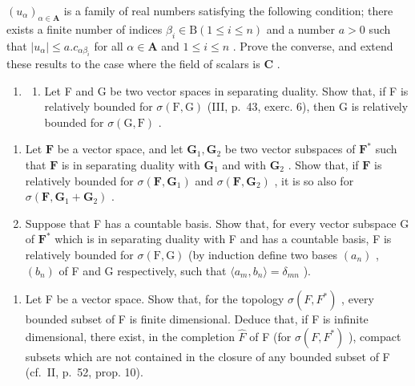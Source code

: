 \((u_{\alpha})_{\alpha \in \mathbf{A}}\) is a family of real numbers satisfying the following condition; there exists a finite number of indices \(\beta_{i}\in \mathrm{B}(1\leqslant i\leqslant n)\) and a number \(a > 0\) such that \(|u_{\alpha}|\leqslant a.c_{\alpha \beta_i}\) for all \(\alpha \in \mathbf{A}\) and \(1\leqslant i\leqslant n\) . Prove the converse, and extend these results to the case where the field of scalars is \(\mathbf{C}\) .

\begin{enumerate}
\def\labelenumi{\arabic{enumi})}
\setcounter{enumi}{1}
\tightlist
\item
  \begin{enumerate}
  \def\labelenumii{\alph{enumii})}
  \tightlist
  \item
    Let F and G be two vector spaces in separating duality. Show that, if F is relatively bounded for \(\sigma(\mathrm{F}, \mathrm{G})\) (III, p.~43, exerc. 6), then G is relatively bounded for \(\sigma(\mathrm{G}, \mathrm{F})\) .
  \end{enumerate}
\end{enumerate}

\begin{enumerate}
\def\labelenumi{\alph{enumi})}
\setcounter{enumi}{1}
\item
  Let \(\mathbf{F}\) be a vector space, and let \(\mathbf{G}_1, \mathbf{G}_2\) be two vector subspaces of \(\mathbf{F}^*\) such that \(\mathbf{F}\) is in separating duality with \(\mathbf{G}_1\) and with \(\mathbf{G}_2\) . Show that, if \(\mathbf{F}\) is relatively bounded for \(\sigma(\mathbf{F}, \mathbf{G}_1)\) and \(\sigma(\mathbf{F}, \mathbf{G}_2)\) , it is so also for \(\sigma(\mathbf{F}, \mathbf{G}_1 + \mathbf{G}_2)\) .
\item
  Suppose that F has a countable basis. Show that, for every vector subspace G of \(\mathbf{F}^*\) which is in separating duality with F and has a countable basis, F is relatively bounded for \(\sigma(\mathrm{F},\mathrm{G})\) (by induction define two bases \((a_n)\) , \((b_n)\) of F and G respectively, such that \(\langle a_m, b_n \rangle = \delta_{mn}\) ).
\end{enumerate}

\begin{enumerate}
\def\labelenumi{\arabic{enumi})}
\setcounter{enumi}{2}
\tightlist
\item
  Let F be a vector space. Show that, for the topology \(\sigma(F, F^{*})\) , every bounded subset of F is finite dimensional. Deduce that, if F is infinite dimensional, there exist, in the completion \(\hat{F}\) of F (for \(\sigma(F, F^{*})\) ), compact subsets which are not contained in the closure of any bounded subset of F (cf.~II, p.~52, prop. 10).
\end{enumerate}

